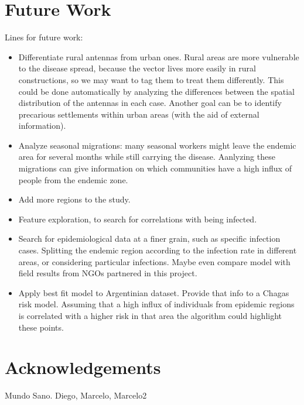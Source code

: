 \section{Future Work}
Lines for future work:
\begin{itemize}
    \item Differentiate rural antennas from urban ones. Rural areas are more vulnerable to the disease spread, because the vector lives more easily in rural constructions, so we may want to tag them to treat them differently. This could be done automatically by analyzing the differences between the spatial distribution of the antennas in each case. Another goal can be to identify precarious settlements within urban areas (with the aid of external information).
    \item Analyze seasonal migrations: many seasonal workers might leave the endemic area for several months while still carrying the disease. Aanlyzing these migrations can give information on which communities have a high influx of people from the endemic zone.
    \item Add more regions to the study.
    \item Feature exploration, to search for correlations with being infected.
    \item Search for epidemiological data at a finer grain, such as specific infection cases. Splitting the endemic region according to the infection rate in different areas, or considering particular infections. %
Maybe even compare model with field results from NGOs partnered in this project.
    \item Apply best fit model to Argentinian dataset. Provide that info to a Chagas risk model. Assuming that a high influx of individuals from epidemic regions is correlated with a higher risk in that area the algorithm could highlight these points. %
\end{itemize}

\section{Acknowledgements}
Mundo Sano. Diego, Marcelo, Marcelo2